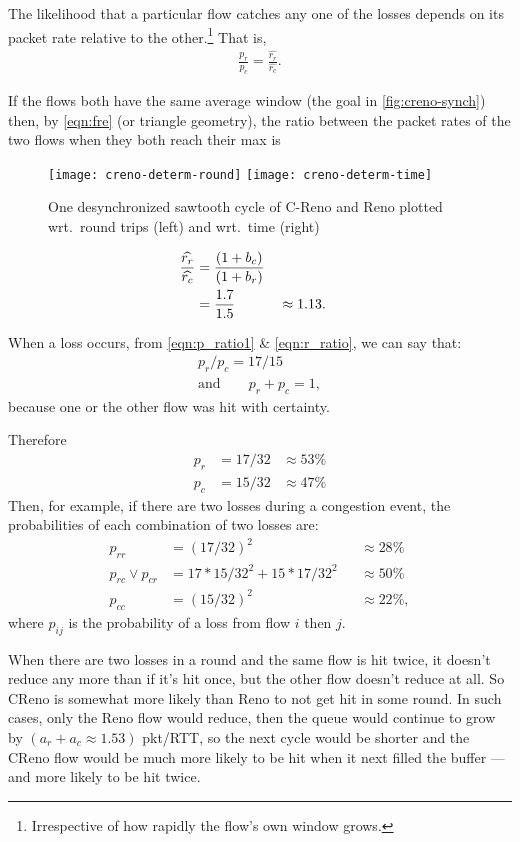 The likelihood that a particular flow catches any one of the losses depends on its packet rate relative to the other.\footnote{Irrespective of how rapidly the flow's own window grows.} That is,
\begin{align}
	\frac{p_r}{p_c} = \frac{\widehat{r_r}}{\widehat{r_c}}.\label{eqn:p_ratio1}
\end{align}


If the flows both have the same average window (the goal in \autoref{fig:creno-synch})
then, by \autoref{eqn:fre} (or triangle geometry), the ratio between the packet rates of the two flows when they both reach their max is
\begin{figure*}
	\centering
	\texttt{[image: creno-determ-round]}
	\texttt{[image: creno-determ-time]}
	\caption{One desynchronized sawtooth cycle of C-Reno and Reno plotted wrt.\ round trips (left) and wrt.\ time (right)}\label{fig:creno-determ}
\end{figure*}
\begin{align}
\frac{\widehat{r_r}}{\widehat{r_c}} &= \frac{(1 + b_c)}{(1 + b_r)}\notag\\
        &= \frac{1.7}{1.5} &&\approx 1.13.\label{eqn:r_ratio}
\end{align}

When a loss occurs, from \autoref{eqn:p_ratio1} \& \autoref{eqn:r_ratio}, we can say that:
\begin{align}
	p_r / p_c = 17/15\label{eqn:p_ratio}\\
\mathrm{and}\qquad p_r + p_c = 1,
\end{align}
because one or the other flow was hit with certainty.

Therefore
\begin{align*}
p_r &= 17/32 &\approx 53\%\\
p_c &= 15/32 &\approx 47\%
\end{align*}
Then, for example, if there are two losses during a congestion event, the probabilities of each combination of two losses are:
\begin{align*}
p_{rr}              &= (17/32)^2               &&\approx 28\%\\
p_{rc} \lor p_{cr}  &= 17*15/32^2 + 15*17/32^2 &&\approx 50\%\\
p_{cc}              &= (15/32)^2               &&\approx 22\%,
\end{align*}
where \(p_{ij}\) is the probability of a loss from flow \(i\) then \(j\).

When there are two losses in a round and the same flow is hit twice, it doesn't reduce any more than if it's hit once, but the other flow doesn't reduce at all. So CReno is somewhat more likely than Reno to not get hit in some round. In such cases, only the Reno flow would reduce, then the queue would continue to grow by \((a_r + a_c \approx 1.53)\) pkt/RTT, so the next cycle would be shorter and the CReno flow would be much more likely to be hit when it next filled the buffer --- and more likely to be hit twice.

